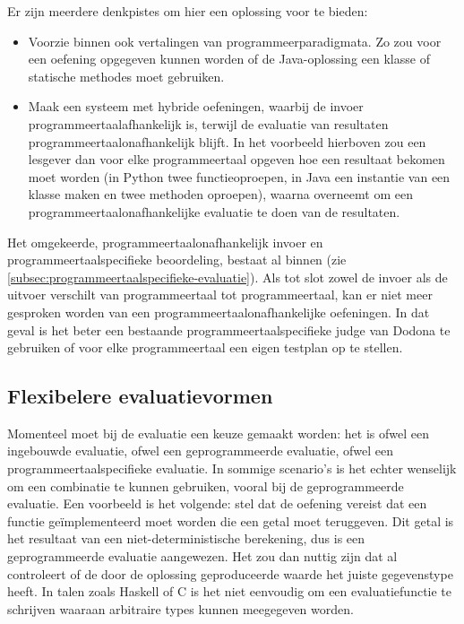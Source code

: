 Er zijn meerdere denkpistes om hier een oplossing voor te bieden:

\begin{itemize}
    \item Voorzie binnen \tested{} ook vertalingen van programmeerparadigmata.
    Zo zou voor een oefening opgegeven kunnen worden of de Java-oplossing een klasse of statische methodes moet gebruiken.
    \item Maak een systeem met hybride oefeningen, waarbij de invoer programmeertaalafhankelijk is, terwijl de evaluatie van resultaten programmeertaalonafhankelijk blijft.
    In het voorbeeld hierboven zou een lesgever dan voor elke programmeertaal opgeven hoe een resultaat bekomen moet worden (in Python twee functieoproepen, in Java een instantie van een klasse maken en twee methoden oproepen), waarna \tested{} overneemt om een programmeertaalonafhankelijke evaluatie te doen van de resultaten.
\end{itemize}

Het omgekeerde, programmeertaalonafhankelijk invoer en programmeertaalspecifieke beoordeling, bestaat al binnen \tested{} (zie \cref{subsec:programmeertaalspecifieke-evaluatie}).
Als tot slot zowel de invoer als de uitvoer verschilt van programmeertaal tot programmeertaal, kan er niet meer gesproken worden van een programmeertaalonafhankelijke oefeningen.
In dat geval is het beter een bestaande programmeertaalspecifieke judge van Dodona te gebruiken of voor elke programmeertaal een eigen testplan op te stellen.

\subsection{Flexibelere evaluatievormen}\label{subsec:combinaties-van-evaluatiemanieren}

Momenteel moet bij de evaluatie een keuze gemaakt worden: het is ofwel een ingebouwde evaluatie, ofwel een geprogrammeerde evaluatie, ofwel een programmeertaalspecifieke evaluatie.
In sommige scenario's is het echter wenselijk om een combinatie te kunnen gebruiken, vooral bij de geprogrammeerde evaluatie.
Een voorbeeld is het volgende: stel dat de oefening vereist dat een functie geïmplementeerd moet worden die een getal moet teruggeven.
Dit getal is het resultaat van een niet-deterministische berekening, dus is een geprogrammeerde evaluatie aangewezen.
Het zou dan nuttig zijn dat \tested{} al controleert of de door de oplossing geproduceerde waarde het juiste gegevenstype heeft.
In talen zoals Haskell of C is het niet eenvoudig om een evaluatiefunctie te schrijven waaraan arbitraire types kunnen meegegeven worden.

